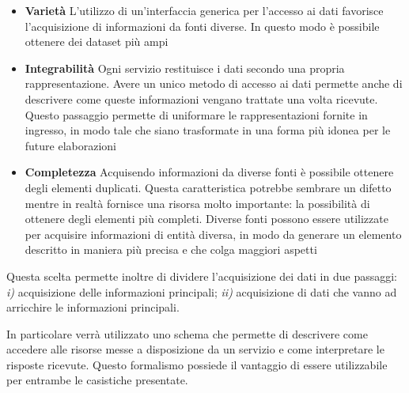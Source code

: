 \begin{itemize}
	\item \textbf{Varietà}
	L'utilizzo di un'interfaccia generica per l'accesso ai dati favorisce l'acquisizione di informazioni da fonti diverse. In questo modo è possibile ottenere dei dataset più ampi
	\item \textbf{Integrabilità}
	Ogni servizio restituisce i dati secondo una propria rappresentazione. Avere un unico metodo di accesso ai dati permette anche di descrivere come queste informazioni vengano trattate una volta ricevute. Questo passaggio permette di uniformare le rappresentazioni fornite in ingresso, in modo tale che siano trasformate in una forma più idonea per le future elaborazioni
	\item \textbf{Completezza}
	Acquisendo informazioni da diverse fonti è possibile ottenere degli elementi duplicati. Questa caratteristica potrebbe sembrare un difetto mentre in realtà fornisce una risorsa molto importante: la possibilità di ottenere degli elementi più completi. Diverse fonti possono essere utilizzate per acquisire informazioni di entità diversa, in modo da generare un elemento descritto in maniera più precisa e che colga maggiori aspetti
\end{itemize}

Questa scelta permette inoltre di dividere l'acquisizione dei dati in due passaggi: \emph{i)} acquisizione delle informazioni principali; \emph{ii)} acquisizione di dati che vanno ad arricchire le informazioni principali. 

In particolare verrà utilizzato uno schema che permette di descrivere come accedere alle risorse messe a disposizione da un servizio e come interpretare le risposte ricevute. Questo formalismo possiede il vantaggio di essere utilizzabile per entrambe le casistiche presentate.